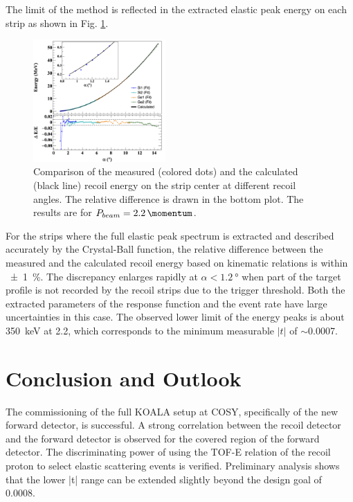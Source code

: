 \documentclass[number,5p]{elsarticle}
\begin{document}
The limit of the method is reflected in the extracted elastic peak energy on each strip as shown in
Fig. \ref{fig:measured_vs_calculated}.
\begin{figure}[bt!]
  \centering
  \includegraphics[width=0.45\textwidth]{./e_vs_alpha_combined.png}
  \caption{
    Comparison of the measured (colored dots) and the calculated (black line)
    recoil energy on the strip center at different recoil angles. The relative
    difference is drawn in the bottom plot. The results are for $P_{beam} = \SI{2.2}{\momentum}$.}
  \label{fig:measured_vs_calculated}
\end{figure}
For the strips where the full elastic peak spectrum is extracted and described accurately
by the Crystal-Ball function, the relative difference between the measured and
the calculated recoil energy based on kinematic relations is within \SI{\pm 1}{\percent}.
The discrepancy enlarges rapidly at $\alpha < \SI{1.2}{\degree}$ when part of
the target profile is not recorded by the recoil strips due to the trigger threshold.
Both the extracted parameters of the response function and the event rate have large uncertainties in this case.
The observed lower limit of the energy peaks is about \SI{350}{\keV} at \SI{2.2}{\momentum}, which corresponds to the minimum measurable $|t|$ of $\sim$\SI{0.0007}{\tmom}.

\section{Conclusion and Outlook}
\label{sec:conclusion}

The commissioning of the full KOALA setup at COSY, specifically of the new forward detector, is successful.
A strong correlation between the recoil detector and the forward detector is
observed for the covered region of the forward detector.
The discriminating power of using the TOF-E relation of the recoil proton to select elastic
scattering events is verified.
Preliminary analysis shows that the lower |t| range can be extended slightly beyond the design goal of \SI{0.0008}{\tmom}.
\end{document}
